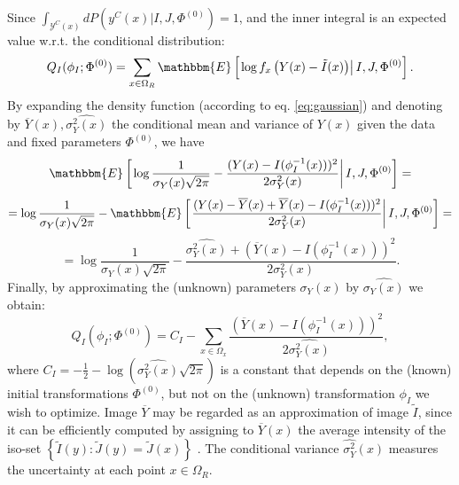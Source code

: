 Since \hbox{$\int_{\mathcal{Y}^{C}(x)}dP(y^{C}(x) | I, J, \Phi^{(0)}) = 1$}, and the inner integral
is an expected value w.r.t. the conditional distribution:
\begin{equation}
     Q_{I}(\phi_{I} ; \Phi^{(0)}) = \sum_{x\in\Omega_{R}} \mathbbm{E} \left[\left.\log f_{x}\left(Y(x) - \tilde{I}(x)\right) \right| I, J, \Phi^{(0)}\right].
\end{equation}
By expanding the density function (according to eq. \eqref{eq:gaussian}) and denoting by $\overline{Y}(x), \widehat{\sigma^{2}_{Y}(x)}$ the conditional mean and variance of $Y(x)$
given the data and fixed parameters $\Phi^{(0)}$, we have
\begin{equation}
    \mathbbm{E} \left[\left.\log \frac{1}{\sigma_{Y}(x)\sqrt{2\pi}} - \frac{(Y(x) - I(\phi^{-1}_{I}(x)))^{2}}{2\sigma^{2}_{Y}(x)}\right|I, J, \Phi^{(0)} \right] =
\end{equation}
\begin{equation}
    = \log \frac{1}{\sigma_{Y}(x)\sqrt{2\pi}} - \mathbbm{E} \left[\left. \frac{(Y(x) - \overline{Y}(x) + \overline{Y}(x) - I(\phi^{-1}_{I}(x)))^{2}}{2\sigma^{2}_{Y}(x)}\right|I, J, \Phi^{(0)} \right]=
\end{equation}
\begin{equation}
    = \log \frac{1}{\sigma_{Y}(x)\sqrt{2\pi}} - \frac{\widehat{\sigma^{2}_{Y}(x)} + (\overline{Y}(x) - I(\phi^{-1}_{I}(x)))^{2}}{2\sigma^{2}_{Y}(x)}.
\end{equation}
Finally, by approximating the (unknown) parameters $\sigma_{Y}(x)$ by $\widehat{\sigma_{Y}(x)}$ we obtain:
\begin{equation}
    Q_{I}(\phi_{I} ; \Phi^{(0)}) = C_{I} - \sum_{x\in\Omega_{x}}\frac{(\overline{Y}(x) - I(\phi^{-1}_{I}(x)))^{2}}{2\widehat{\sigma^{2}_{Y}(x)}},
\end{equation}
where $C_{I} = -\frac{1}{2} - \log\left(\widehat{\sigma^{2}_{Y}(x)}\sqrt{2\pi}\right)$ is a constant that depends on the (known) initial transformations $\Phi^{(0)}$, but not on the (unknown) transformation $\phi_{I}$ we wish to optimize. Image $\overline{Y}$ may be regarded as an approximation of image $\tilde{I}$, since it can be efficiently computed by assigning to $\overline{Y}(x)$ the average intensity of the iso-set $\left\lbrace \tilde{I}(y) : \tilde{J}(y) = \tilde{J}(x)\right\rbrace$ \cite{Roche1998}. The conditional variance $\widehat{\sigma^{2}_{Y}}(x)$ measures the uncertainty at each point $x\in \Omega_{R}$.\\

